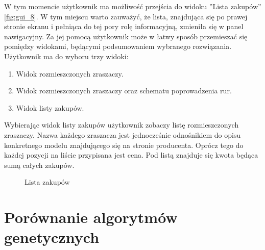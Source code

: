 \documentclass[twoside]{iisthesis}
\begin{document}
W tym momencie użytkownik ma możliwość przejścia do widoku ''Lista zakupów'' \eqref{fig:gui_8}. W tym miejscu warto zauważyć, że lista, znajdująca się po prawej stronie ekranu i pełniąca do tej pory rolę informacyjną, zmieniła się w panel nawigacyjny. Za jej pomocą użytkownik może w łatwy sposób przemieszać się pomiędzy widokami, będącymi podsumowaniem wybranego rozwiązania. Użytkownik ma do wyboru trzy widoki:\\
\begin{enumerate}
	\item Widok rozmieszczonych zraszaczy.
	\item Widok rozmieszczonych zraszaczy oraz schematu poprowadzenia rur.
	\item Widok listy zakupów.\\
\end{enumerate}

Wybierając widok listy zakupów użytkownik zobaczy listę rozmieszczonych zraszaczy. Nazwa każdego zraszacza jest jednocześnie odnośnikiem do opisu konkretnego modelu znajdującego się na stronie producenta. Oprócz tego do każdej pozycji na liście przypisana jest cena. Pod listą znajduje się kwota będąca sumą całych zakupów.
\begin{figure}[!htb]
	\centering
	\caption{Lista zakupów}
	\label{fig:gui_8}
\end{figure}
\section{Porównanie algorytmów genetycznych}
\end{document}
